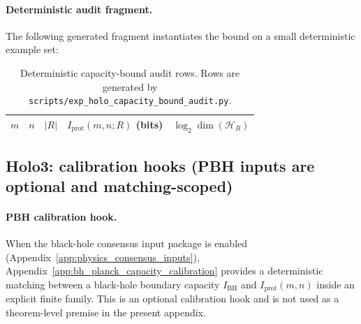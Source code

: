 \paragraph{Deterministic audit fragment.}
\AuditTag The following generated fragment instantiates the bound on a small deterministic example set:
\begin{table}[H]
\centering
\scriptsize
\setlength{\tabcolsep}{6pt}
\renewcommand{\arraystretch}{1.15}
\begin{tabular}{c c c c c}
\toprule
$m$ & $n$ & $|R|$ & $I_{\mathrm{prot}}(m,n;R)$ (bits) & $\log_2\dim(\mathcal{H}_R)$ \\
\midrule
%
\end{tabular}
\caption{Deterministic capacity-bound audit rows. Rows are generated by \texttt{scripts/exp\_holo\_capacity\_bound\_audit.py}.}
\label{tab:holo_capacity_bound_audit}
\end{table}
%

\subsection{Holo3: calibration hooks (PBH inputs are optional and matching-scoped)}
\label{subsec:holo3_calibration_hooks}

\paragraph{PBH calibration hook.}
\MatchTag When the black-hole consensus input package is enabled (Appendix~\ref{app:physics_consensus_inputs}),
Appendix~\ref{app:bh_planck_capacity_calibration} provides a deterministic matching between a black-hole boundary capacity
$I_{\mathrm{BH}}$ and $I_{\mathrm{prot}}(m,n)$ inside an explicit finite family.
This is an optional \MatchTag calibration hook and is not used as a theorem-level premise in the present appendix.

